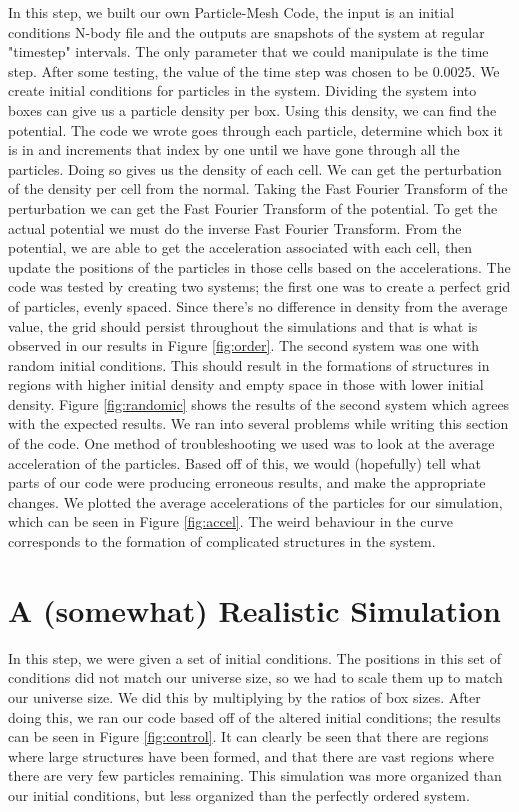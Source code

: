 \documentclass[10pt]{article}
\begin{document}
	In this step, we built our own Particle-Mesh Code, the input is an initial conditions N-body file and the outputs are snapshots of the system at regular "timestep" intervals. The only parameter that we could manipulate is the time step. After some testing, the value of the time step was chosen to be 0.0025. We create initial conditions for particles in the system. Dividing the system into boxes can give us a particle density per box. Using this density, we can find the potential. The code we wrote goes through each particle, determine which box it is in and increments that index by one until we have gone through all the particles. Doing so gives us the density of each cell. We can get the perturbation of the density per cell from the normal. Taking the Fast Fourier Transform of the perturbation we can get the Fast Fourier Transform of the potential. To get the actual potential we must do the inverse Fast Fourier Transform. From the potential, we are able to get the acceleration associated with each cell, then update the positions of the particles in those cells based on the accelerations. 
	The code was tested by creating two systems; the first one was to create a perfect grid of particles, evenly spaced. Since there’s no difference in density from the average value, the grid should persist throughout the simulations and that is what is observed in our results in Figure \ref{fig:order}{}. The second system was one with random initial conditions. This should result in the formations of structures in regions with higher initial density and empty space in those with lower initial density. Figure \ref{fig:randomic}{} shows the results of the second system which agrees with the expected results.
	We ran into several problems while writing this section of the code. One method of troubleshooting we used was to look at the average acceleration of the particles. Based off of this, we would (hopefully) tell what parts of our code were producing erroneous results, and make the appropriate changes. We plotted the average accelerations of the particles for our simulation, which can be seen in Figure \ref{fig:accel}{}. The weird behaviour in the curve corresponds to the formation of complicated structures in the system.




\section{A (somewhat) Realistic Simulation}
	In this step, we were given a set of initial conditions. The positions in this set of conditions did not match our universe size, so we had to scale them up to match our universe size. We did this by multiplying by the ratios of box sizes. After doing this, we ran our code based off of the altered initial conditions; the results can be seen in Figure \ref{fig:control}{}. It can clearly be seen that there are regions where large structures have been formed, and that there are vast regions where there are very few particles remaining.
	This simulation was more organized than our initial conditions, but less organized than the perfectly ordered system.
	
\end{document}
